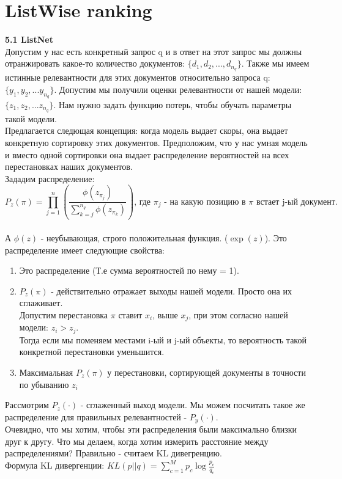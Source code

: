 \documentclass{article}
\begin{document}
\section{ListWise ranking}
\textbf{5.1 ListNet}\\

Допустим у нас есть конкретный запрос q и в ответ на этот запрос мы должны отранжировать какое-то количество документов: $\{d_1, d_2, ... , d_{n_{q}}\}$. Также мы имеем истинные релевантности для этих документов относительно запроса q: $\{ y_1, y_2, ... y_{n_{q}}\}$. Допустим мы получили оценки релевантности от нашей модели: $\{z_1, z_2, ... z_{n_{q}} \}$. Нам нужно задать функцию потерь, чтобы обучать параметры такой модели. \\

Предлагается следющая концепция: когда модель выдает скоры, она выдает конкретную сортировку этих документов. Предположим, что у нас умная модель и вместо одной сортировки она выдает распределение вероятностей на всех перестановках наших документов. \\

Зададим распределение: $$P_{z}(\pi) = \prod\limits_{j=1}^n{\left(
\frac{
    \phi(z_{\pi_{j}})
    }{
    \sum\limits_{k=j}^{n_q}{\phi(z_{\pi_{k}})}
    }
\right)}  
\text{, где $\pi_j$ - на какую позицию в $\pi$ встает j-ый документ.}$$ \\  А $\phi(z)$ - неубывающая, строго положительная функция. ($\exp(z)$).  Это распределение имеет следующие свойства: 
\begin{enumerate}
\item Это распределение (Т.е сумма вероятностей по нему = 1).
\item $P_z(\pi)$ - действительно отражает выходы нашей модели. Просто она их сглаживает. \\Допустим перестановка $\pi$ ставит $x_i$, выше $x_j$, при этом  согласно нашей модели: $z_i > z_j$.\\ Тогда если мы поменяем местами i-ый и j-ый объекты, то вероятность такой конкретной перестановки уменьшится. 
\item Максимальная $P_z(\pi)$ у перестановки, сортирующей документы в точности по убыванию $z_i$
\end{enumerate}

Рассмотрим $P_z(\cdot)$ - сглаженный выход модели. Мы можем посчитать такое же распределение для правильных релевантностей - $P_y(\cdot)$. \\ Очевидно, что мы хотим, чтобы эти распределения были максимально близки друг к другу. Что мы делаем, когда хотим измерить расстояние между распределениями? Правильно - считаем KL дивегренцию.  \\
Формула KL дивергенции: $KL(p || q) = \sum\limits_{c=1}^{M}p_c \log{\frac{p_c}{q_c}}$ \\
\end{document}
